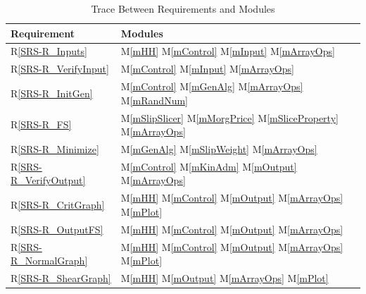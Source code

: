 \documentclass[12pt, titlepage]{article}
\newcommand{\rref}[1]{R\ref{#1}}
\newcommand{\mref}[1]{M\ref{#1}}
\begin{document}
\begin{table}[h!]
\centering
\begin{tabular}{ll}
\toprule
\textbf{Requirement} & \textbf{Modules}\\
\midrule
\rref{SRS-R_Inputs} & \mref{mHH} \mref{mControl} \mref{mInput} 
\mref{mArrayOps}\\
\rref{SRS-R_VerifyInput} & \mref{mControl} \mref{mInput} \mref{mArrayOps}\\
\rref{SRS-R_InitGen} & \mref{mControl} \mref{mGenAlg} \mref{mArrayOps} 
\mref{mRandNum} \\
\rref{SRS-R_FS} & \mref{mSlipSlicer} \mref{mMorgPrice} \mref{mSliceProperty} 
\mref{mArrayOps}\\
\rref{SRS-R_Minimize} & \mref{mGenAlg} \mref{mSlipWeight} \mref{mArrayOps}\\
\rref{SRS-R_VerifyOutput} & \mref{mControl} \mref{mKinAdm} \mref{mOutput} 
\mref{mArrayOps}\\
\rref{SRS-R_CritGraph} & \mref{mHH} \mref{mControl} \mref{mOutput} 
\mref{mArrayOps} \mref{mPlot}\\
\rref{SRS-R_OutputFS} & \mref{mHH} \mref{mControl} \mref{mOutput} 
\mref{mArrayOps}\\
\rref{SRS-R_NormalGraph} & \mref{mHH} \mref{mControl} \mref{mOutput} 
\mref{mArrayOps} \mref{mPlot}\\
\rref{SRS-R_ShearGraph} & \mref{mHH} \mref{mOutput} \mref{mArrayOps} 
\mref{mPlot}\\
\bottomrule
\end{tabular}
\caption{Trace Between Requirements and Modules}
\label{Table:Req}
\end{table}
\end{document}
